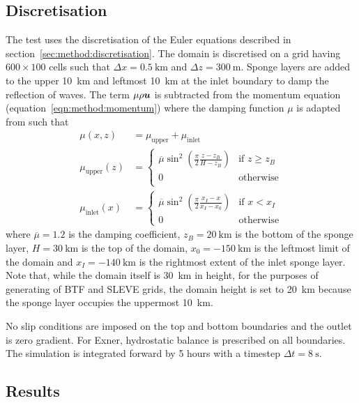 \subsection{Discretisation}
The test uses the discretisation of the Euler equations described in section~\ref{sec:method:discretisation}.  The domain is discretised on a grid having $600 \times 100$ cells such that $\Delta x = \SI{0.5}{\kilo\meter}$ and $\Delta z = \SI{300}{\meter}$.  Sponge layers are added to the upper \SI{10}{\kilo\meter} and leftmost \SI{10}{\kilo\meter} at the inlet boundary to damp the reflection of waves.
The term $\mu \rho \bm{u}$ is subtracted from the momentum equation (equation~\ref{eqn:method:momentum}) where the damping function $\mu$ is adapted from \textcite{melvin2010} such that
\begin{align}
	\mu(x, z) &= \mu_\mathrm{upper} + \mu_\mathrm{inlet} \\
	\mu_\mathrm{upper}(z) &= \begin{cases}
		\overline{\mu} \sin^2 \left( \frac{\pi}{2} \frac{z - z_B}{H - z_B} \right) & \text{if } z \geq z_B \\
		0 & \text{otherwise} \\
	\end{cases} \\
	\mu_\mathrm{inlet}(x) &= \begin{cases}
		\overline{\mu} \sin^2 \left( \frac{\pi}{2} \frac{x_I - x}{x_I - x_0} \right) & \text{if } x < x_I \\
		0 & \text{otherwise}
	\end{cases}
\end{align}
where $\overline{\mu} = 1.2$ is the damping coefficient, $z_B = \SI{20}{\kilo\meter}$ is the bottom of the sponge layer, $H = \SI{30}{\kilo\meter}$ is the top of the domain, $x_0 = \SI{-150}{\kilo\meter}$ is the leftmost limit of the domain and $x_I = \SI{-140}{\kilo\meter}$ is the rightmost extent of the inlet sponge layer.  Note that, while the domain itself is \SI{30}{\kilo\meter} in height, for the purposes of generating of BTF and SLEVE grids, the domain height is set to \SI{20}{\kilo\meter} because the sponge layer occupies the uppermost \SI{10}{\kilo\meter}.

No slip conditions are imposed on the top and bottom boundaries and the outlet is zero gradient.  For Exner, hydrostatic balance is prescribed on all boundaries.  The simulation is integrated forward by 5 hours with a timestep $\Delta t = \SI{8}{\second}$.

\subsection{Results}


